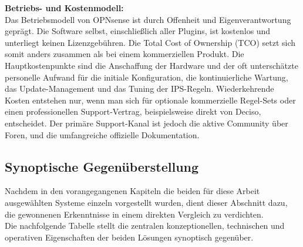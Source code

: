 \textbf{Betriebs- und Kostenmodell:}\\
Das Betriebsmodell von OPNsense ist durch Offenheit und Eigenverantwortung geprägt. Die Software selbst, einschließlich aller Plugins, ist kostenlos und unterliegt keinen Lizenzgebühren. Die Total Cost of Ownership (TCO) setzt sich somit anders zusammen als bei einem kommerziellen Produkt. Die Hauptkostenpunkte sind die Anschaffung der Hardware und der oft unterschätzte personelle Aufwand für die initiale Konfiguration, die kontinuierliche Wartung, das Update-Management und das Tuning der IPS-Regeln. Wiederkehrende Kosten entstehen nur, wenn man sich für optionale kommerzielle Regel-Sets oder einen professionellen Support-Vertrag, beispielsweise direkt von Deciso, entscheidet. Der primäre Support-Kanal ist jedoch die aktive Community über Foren, und die umfangreiche offizielle Dokumentation.
\newpage

\subsection{Synoptische Gegenüberstellung}
Nachdem in den vorangegangenen Kapiteln die beiden für diese Arbeit ausgewählten Systeme einzeln vorgestellt wurden, dient dieser Abschnitt dazu, die gewonnenen Erkenntnisse in einem direkten Vergleich zu verdichten.\\
Die nachfolgende Tabelle stellt die zentralen konzeptionellen, technischen und operativen Eigenschaften der beiden Lösungen synoptisch gegenüber.\\

